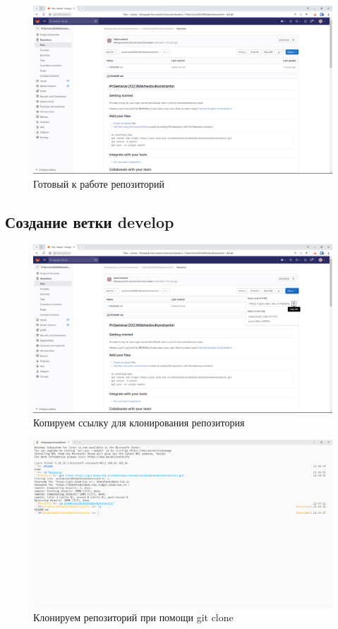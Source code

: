 \documentclass[a4paper]{article}
\begin{document}
  \begin{figure}[H]
    \centering
    \includegraphics[width=\textwidth]{1_ (50)}
    \caption{Готовый к работе репозиторий}
  \end{figure}

  \subsection{Создание ветки develop}

  \begin{figure}[H]
    \centering
    \includegraphics[width=\textwidth]{1_ (49)}
    \caption{Копируем ссылку для клонирования репозитория}
  \end{figure}

  \begin{figure}[H]
    \centering
    \includegraphics[width=\textwidth]{1_ (48)}
    \caption{Клонируем репозиторий при помощи git clone}
  \end{figure}
\end{document}
